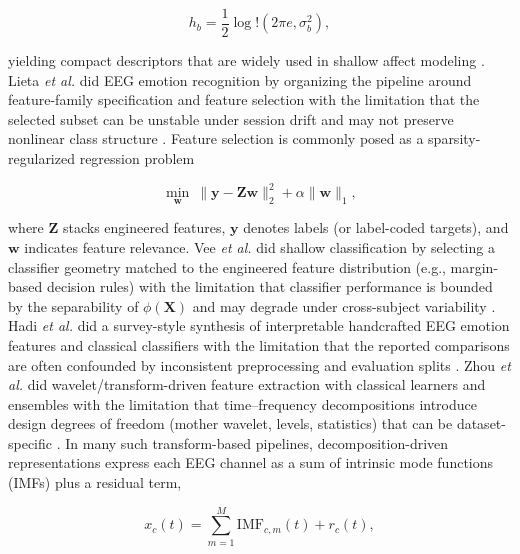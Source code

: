 \documentclass{WileyMSP-template}
\begin{document}
\begin{equation}
h_b=\frac{1}{2}\log!\left(2\pi e,\sigma_b^2\right),
\end{equation}

yielding compact descriptors that are widely used in shallow affect modeling \cite{ztliuq2019electroe,gkpvee2019eegbased}. Lieta \textit{et al.} did EEG emotion recognition by organizing the pipeline around feature-family specification and feature selection with the limitation that the selected subset can be unstable under session drift and may not preserve nonlinear class structure \cite{plieta2019eegbased}. Feature selection is commonly posed as a sparsity-regularized regression problem

\begin{equation}
\min_{\mathbf{w}}\ \lVert \mathbf{y}-\mathbf{Z}\mathbf{w}\rVert_2^2+\alpha\lVert\mathbf{w}\rVert_1,
\end{equation}

where $\mathbf{Z}$ stacks engineered features, $\mathbf{y}$ denotes labels (or label-coded targets), and $\mathbf{w}$ indicates feature relevance. Vee \textit{et al.} did shallow classification by selecting a classifier geometry matched to the engineered feature distribution (e.g., margin-based decision rules) with the limitation that classifier performance is bounded by the separability of $\phi(\mathbf{X})$ and may degrade under cross-subject variability \cite{gkpvee2019eegbased}. Hadi \textit{et al.} did a survey-style synthesis of interpretable handcrafted EEG emotion features and classical classifiers with the limitation that the reported comparisons are often confounded by inconsistent preprocessing and evaluation splits \cite{sphadi2019asurveyo}. Zhou \textit{et al.} did wavelet/transform-driven feature extraction with classical learners and ensembles with the limitation that time--frequency decompositions introduce design degrees of freedom (mother wavelet, levels, statistics) that can be dataset-specific \cite{thzhou2020waveletb}. In many such transform-based pipelines, decomposition-driven representations express each EEG channel as a sum of intrinsic mode functions (IMFs) plus a residual term,

\begin{equation}
x_c(t)=\sum_{m=1}^{M}\mathrm{IMF}_{c,m}(t)+r_c(t),
\end{equation}
\end{document}
